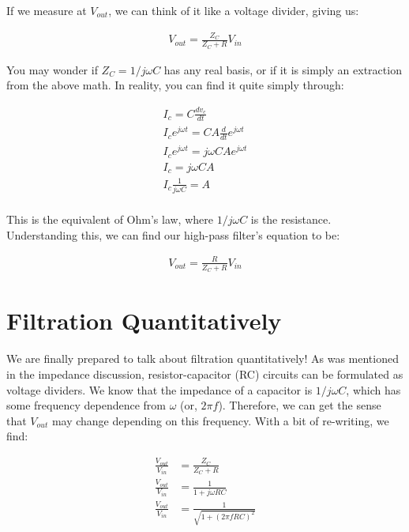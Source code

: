 \documentclass[12pt]{report}
\newcommand{\Vo}{{V}_{out}}
\newcommand{\Vi}{{V}_{in}}
\begin{document}
If we measure at $\Vo$, we can think of it like a voltage divider, giving us: 

\begin{equation} \label{imp3}
\begin{split}
\Vo = \frac{Z_C}{Z_C + R}\Vi
\end{split}
\end{equation}

You may wonder if $Z_C = {1} / j\omega C$ has any real basis, or if it is simply an extraction from the above math. In reality, you can find it quite simply through: 

\begin{equation} \label{imp4}
\begin{split}
I_c = C\frac{dv_c}{dt} \\
I_ce^{j\omega t} = CA\frac{d}{dt}e^{j\omega t} \\
I_ce^{j\omega t} = j\omega CAe^{j\omega t} \\
I_c = j\omega CA \\
I_c\frac{1}{j\omega C} = A \\
\end{split}
\end{equation}

This is the equivalent of Ohm's law, where ${1} /{j\omega C}$ is the resistance. Understanding this, we can find our high-pass filter's equation to be: 

\begin{equation} \label{imp3}
\begin{split}
\Vo = \frac{R}{Z_C + R}\Vi
\end{split}
\end{equation}

\section{Filtration Quantitatively}
We are finally prepared to talk about filtration quantitatively! As was mentioned in the impedance discussion, resistor-capacitor (RC) circuits can be formulated as voltage dividers. We know that the impedance of a capacitor is ${1} /{j\omega C}$, which has some frequency dependence from $\omega$ (or, $2\pi f$). Therefore, we can get the sense that $\Vo$ may change depending on this frequency. With a bit of re-writing, we find: 

\begin{equation} \label{filt1}
\begin{split}
\frac{\Vo}{\Vi} &= \frac{Z_C}{Z_C + R} \\
\frac{\Vo}{\Vi} &= \frac{1}{1 + j\omega RC} \\
\frac{\Vo}{\Vi} &= \frac{1}{\sqrt{1 + (2\pi f RC)^2}} \\
\end{split}
\end{equation}
\end{document}
